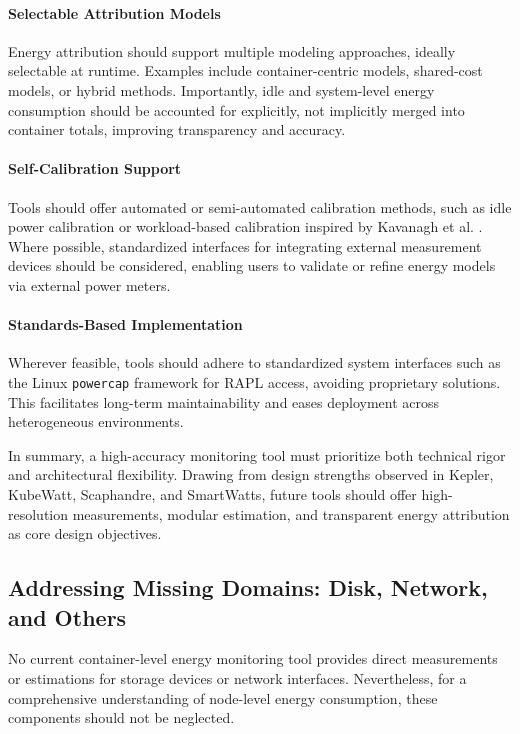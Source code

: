 \paragraph{Selectable Attribution Models}
Energy attribution should support multiple modeling approaches, ideally selectable at runtime. Examples include container-centric models, shared-cost models, or hybrid methods. Importantly, idle and system-level energy consumption should be accounted for explicitly, not implicitly merged into container totals, improving transparency and accuracy.

\paragraph{Self-Calibration Support}
Tools should offer automated or semi-automated calibration methods, such as idle power calibration or workload-based calibration inspired by Kavanagh et al. \parencite{kavanagh2019rapid}. Where possible, standardized interfaces for integrating external measurement devices should be considered, enabling users to validate or refine energy models via external power meters.

\paragraph{Standards-Based Implementation}
Wherever feasible, tools should adhere to standardized system interfaces such as the Linux \texttt{powercap} framework for RAPL access, avoiding proprietary solutions. This facilitates long-term maintainability and eases deployment across heterogeneous environments.

In summary, a high-accuracy monitoring tool must prioritize both technical rigor and architectural flexibility. Drawing from design strengths observed in Kepler, KubeWatt, Scaphandre, and SmartWatts, future tools should offer high-resolution measurements, modular estimation, and transparent energy attribution as core design objectives.

\subsection{Addressing Missing Domains: Disk, Network, and Others}
\label{sec:future-missing-domains}

No current container-level energy monitoring tool provides direct measurements or estimations for storage devices or network interfaces. Nevertheless, for a comprehensive understanding of node-level energy consumption, these components should not be neglected.


